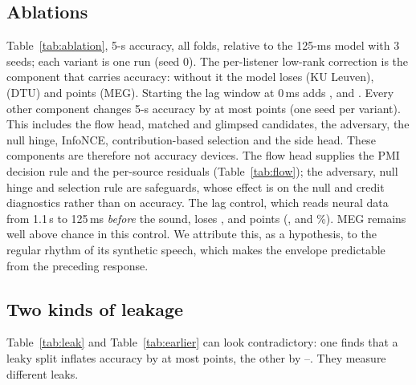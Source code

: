 \documentclass[10pt,twocolumn,letterpaper]{article}
\begin{document}
\subsection{Ablations}\label{app:ablation}
Table~\ref{tab:ablation}, 5-s accuracy, all folds, relative to the
125-ms model with 3 seeds; each variant is one run (seed 0). The per-listener low-rank correction is the component that
carries accuracy: without it the model loses \ablRankKUL{} (KU Leuven), \ablRankDTU{} (DTU) and
\ablRankMEG{} points (MEG). Starting the lag window at 0\,ms adds \lagZeroKUL, \lagZeroDTU{}
and \lagZeroMEG. Every other component changes 5-s accuracy by at most \ablOtherMax{} points
(one seed per variant). This includes the flow head, matched and glimpsed candidates,
the adversary, the null hinge, InfoNCE, contribution-based selection and the side head. These
components are therefore not accuracy devices. The flow head supplies the PMI decision rule
and the per-source residuals (Table~\ref{tab:flow}); the adversary, null hinge and selection
rule are safeguards, whose effect is on the null and credit diagnostics rather than on
accuracy. The lag control, which reads neural data from 1.1\,s to 125\,ms \emph{before} the
sound, loses \lagCtlKUL, \lagCtlDTU{} and \lagCtlMEG{} points (\lagCtlAccKUL, \lagCtlAccDTU{} and
\lagCtlAccMEG\%). MEG remains well above chance in this control. We attribute this, as a
hypothesis, to the regular rhythm of its synthetic speech, which makes the envelope
predictable from the preceding response.
\begin{table}[h]\centering\small
\caption{Change in 5-s accuracy (points) when one component is removed; full model:
mean$\pm$s.d.\ over 3 seeds, 125-ms lag window; variants: seed 0.}\label{tab:ablation}

\end{table}

\FloatBarrier
\subsection{Two kinds of leakage}\label{app:leak}
Table~\ref{tab:leak} and Table~\ref{tab:earlier} can look contradictory: one finds that a
leaky split inflates accuracy by at most \leakMax{} points, the other by
\oldDropAllMin--\oldDropAllMax. They measure different leaks.
\end{document}
